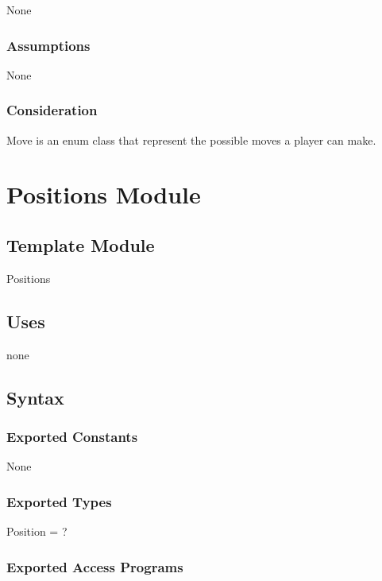 \documentclass[12pt]{article}
\begin{document}
None

\subsubsection* {Assumptions}

None

\subsubsection* {Consideration}

Move is an enum class that represent the possible moves a player can make.

\newpage

\section* {Positions Module}

\subsection*{Template Module}

Positions

\subsection* {Uses}

none

\subsection* {Syntax}

\subsubsection* {Exported Constants}

None

\subsubsection* {Exported Types}

Position = ?

\subsubsection* {Exported Access Programs}
\end{document}
